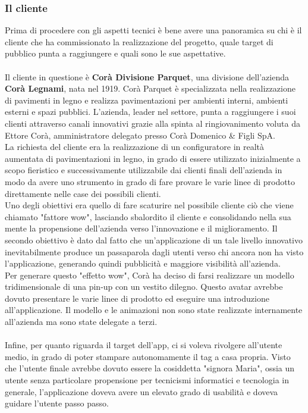 \subsubsection{Il cliente}
Prima di procedere con gli aspetti tecnici \`e bene avere una panoramica su chi \`e il cliente che ha commissionato la realizzazione del progetto, quale target di pubblico punta a raggiungere e quali sono le sue aspettative.
\\\\
Il cliente in questione \`e \textbf{Cor\`a Divisione Parquet}, una divisione dell'azienda \textbf{Cor\`a Legnami}, nata nel 1919. Cor\`a Parquet \`e specializzata nella realizzazione di pavimenti in legno e realizza pavimentazioni per ambienti interni, ambienti esterni e spazi pubblici. L'azienda, leader nel settore, punta a raggiungere i suoi clienti attraverso canali innovativi grazie alla spinta al ringiovanimento voluta da Ettore Cor\`a, amministratore delegato presso Cor\`a Domenico \& Figli SpA.\\
La richiesta del cliente era la realizzazione di un configuratore in realt\`a aumentata di pavimentazioni in legno, in grado di essere utilizzato inizialmente a scopo fieristico e successivamente utilizzabile dai clienti finali dell'azienda in modo da avere uno strumento in grado di fare provare le varie linee di prodotto direttamente nelle case dei possibili clienti.\\
Uno degli obiettivi era quello di fare scaturire nel possibile cliente ci\`o che viene chiamato "fattore wow", lasciando sbalordito il cliente e consolidando nella sua mente la propensione dell'azienda verso l'innovazione e il miglioramento.
Il secondo obiettivo \`e dato dal fatto che un'applicazione di un tale livello innovativo inevitabilmente produce un passaparola dagli utenti verso chi ancora non ha visto l'applicazione, generando quindi pubblicit\`a e maggiore visibilit\`a all'azienda.\\
Per generare questo "effetto wow", Cor\`a ha deciso di farsi realizzare un modello tridimensionale di una pin-up con un vestito dilegno. Questo avatar avrebbe dovuto presentare le varie linee di prodotto ed eseguire una introduzione all'applicazione. Il modello e le animazioni non sono state realizzate internamente all'azienda ma sono state delegate a terzi.\\\\
Infine, per quanto riguarda il target dell'app, ci si voleva rivolgere all'utente medio, in grado di poter stampare autonomamente il tag a casa propria. Visto che l'utente finale avrebbe dovuto essere la cosiddetta "signora Maria", ossia un utente senza particolare propensione per tecnicismi informatici e tecnologia in generale, l'applicazione doveva avere un elevato grado di usabilit\`a e doveva guidare l'utente passo passo.

